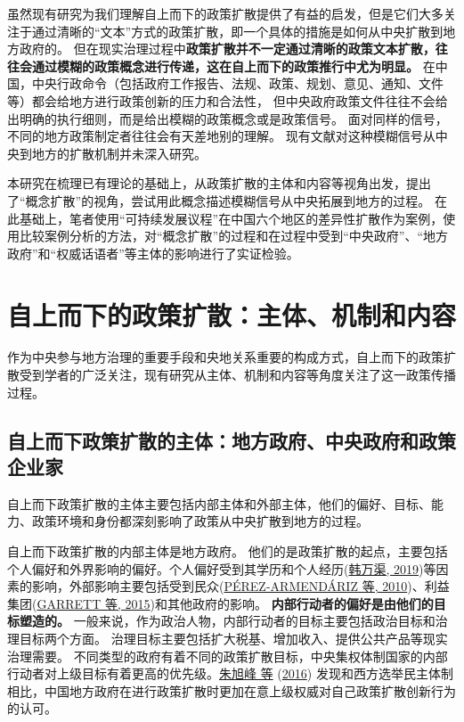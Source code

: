 \documentclass[
  12pt,
]{ctexart}
\begin{document}
虽然现有研究为我们理解自上而下的政策扩散提供了有益的启发，但是它们大多关注于通过清晰的``文本''方式的政策扩散，即一个具体的措施是如何从中央扩散到地方政府的。
但在现实治理过程中\textbf{政策扩散并不一定通过清晰的政策文本扩散，往往会通过模糊的政策概念进行传递，这在自上而下的政策推行中尤为明显。}
在中国，中央行政命令（包括政府工作报告、法规、政策、规划、意见、通知、文件等）都会给地方进行政策创新的压力和合法性，
但中央政府政策文件往往不会给出明确的执行细则，而是给出模糊的政策概念或是政策信号。
面对同样的信号，不同的地方政策制定者往往会有天差地别的理解。
现有文献对这种模糊信号从中央到地方的扩散机制并未深入研究。

本研究在梳理已有理论的基础上，从政策扩散的主体和内容等视角出发，提出了``概念扩散''的视角，尝试用此概念描述模糊信号从中央拓展到地方的过程。
在此基础上，笔者使用``可持续发展议程''在中国六个地区的差异性扩散作为案例，使用比较案例分析的方法，对``概念扩散''的过程和在过程中受到``中央政府''、``地方政府''和``权威话语者''等主体的影响进行了实证检验。

\hypertarget{ux81eaux4e0aux800cux4e0bux7684ux653fux7b56ux6269ux6563ux4e3bux4f53ux673aux5236ux548cux5185ux5bb9}{%
\section{自上而下的政策扩散：主体、机制和内容}\label{ux81eaux4e0aux800cux4e0bux7684ux653fux7b56ux6269ux6563ux4e3bux4f53ux673aux5236ux548cux5185ux5bb9}}

作为中央参与地方治理的重要手段和央地关系重要的构成方式，自上而下的政策扩散受到学者的广泛关注，现有研究从主体、机制和内容等角度关注了这一政策传播过程。

\hypertarget{ux81eaux4e0aux800cux4e0bux653fux7b56ux6269ux6563ux7684ux4e3bux4f53ux5730ux65b9ux653fux5e9cux4e2dux592eux653fux5e9cux548cux653fux7b56ux4f01ux4e1aux5bb6}{%
\subsection{自上而下政策扩散的主体：地方政府、中央政府和政策企业家}\label{ux81eaux4e0aux800cux4e0bux653fux7b56ux6269ux6563ux7684ux4e3bux4f53ux5730ux65b9ux653fux5e9cux4e2dux592eux653fux5e9cux548cux653fux7b56ux4f01ux4e1aux5bb6}}

自上而下政策扩散的主体主要包括内部主体和外部主体，他们的偏好、目标、能力、政策环境和身份都深刻影响了政策从中央扩散到地方的过程。

自上而下政策扩散的内部主体是地方政府。
他们的是政策扩散的起点，主要包括个人偏好和外界影响的偏好。个人偏好受到其学历和个人经历(\protect\hyperlink{ref-HanWanQu2019}{韩万渠, 2019})等因素的影响，外部影响主要包括受到民众(\protect\hyperlink{ref-Perez-ArmendarizCrow2010}{PÉREZ-ARMENDÁRIZ 等, 2010})、利益集团(\protect\hyperlink{ref-GarrettJansa2015}{GARRETT 等, 2015})和其他政府的影响。
\textbf{内部行动者的偏好是由他们的目标塑造的。}
一般来说，作为政治人物，内部行动者的目标主要包括政治目标和治理目标两个方面。
治理目标主要包括扩大税基、增加收入、提供公共产品等现实治理需要。
不同类型的政府有着不同的政策扩散目标，中央集权体制国家的内部行动者对上级目标有着更高的优先级。\protect\hyperlink{ref-ZhuXuFengZhaoHui2016}{朱旭峰 等} (\protect\hyperlink{ref-ZhuXuFengZhaoHui2016}{2016}) 发现和西方选举民主体制相比，中国地方政府在进行政策扩散时更加在意上级权威对自己政策扩散创新行为的认可。
\end{document}
